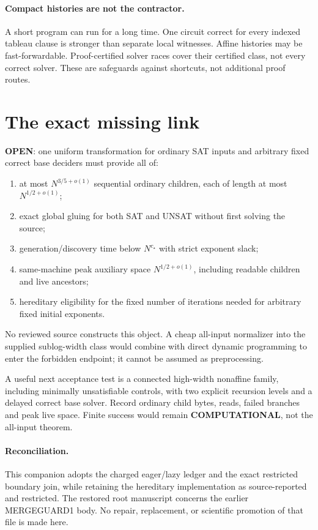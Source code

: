 \documentclass[11pt]{article}
\newcommand{\OPEN}{\textbf{OPEN}}
\begin{document}
\paragraph{Compact histories are not the contractor.}
A short program can run for a long time. One circuit correct for every
indexed tableau clause is stronger than separate local witnesses.
Affine histories may be fast-forwardable. Proof-certified solver races
cover their certified class, not every correct solver. These are
safeguards against shortcuts, not additional proof routes.

\section{The exact missing link}
\OPEN: one uniform transformation for ordinary SAT inputs and arbitrary
fixed correct base deciders must provide all of:
\begin{enumerate}
\item at most $N^{3/5+o(1)}$ sequential ordinary children, each of length
      at most $N^{1/2+o(1)}$;
\item exact global gluing for both SAT and UNSAT without first solving the source;
\item generation/discovery time below $N^{c_\star}$ with strict exponent slack;
\item same-machine peak auxiliary space $N^{1/2+o(1)}$, including readable
      children and live ancestors;
\item hereditary eligibility for the fixed number of iterations needed
      for arbitrary fixed initial exponents.
\end{enumerate}
No reviewed source constructs this object.
A cheap all-input normalizer into the supplied sublog-width class would
combine with direct dynamic programming to enter the forbidden endpoint;
it cannot be assumed as preprocessing.

A useful next acceptance test is a connected high-width nonaffine family,
including minimally unsatisfiable controls, with two explicit recursion
levels and a delayed correct base solver. Record ordinary child bytes,
reads, failed branches and peak live space. Finite success would remain
\textbf{COMPUTATIONAL}, not the all-input theorem.

\paragraph{Reconciliation.}
This companion adopts the charged eager/lazy ledger and the exact restricted
boundary join, while retaining the hereditary implementation as
source-reported and restricted. The restored root manuscript concerns the
earlier MERGEGUARD1 body. No repair, replacement, or scientific promotion
of that file is made here.
\end{document}
